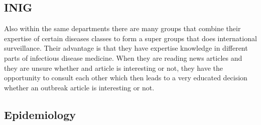 \subsection{INIG}
Also within the same departments there are many groups that combine their
expertise of certain diseases classes to form a super groups that does international
surveillance. Their advantage is that they have expertise knowledge in different
parts of infectious disease medicine. When they are reading news articles and they
are unsure whether and article is interesting or not, they have the opportunity
to consult each other which then leads to a very educated decision whether an
outbreak article is interesting or not.

\subsection{Epidemiology}

